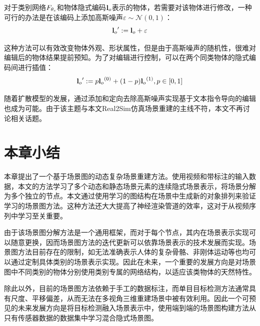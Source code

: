 对于类别网络$F_{{\theta_{c}}}$和物体隐式编码${\mathbf{l}_o}$表示的物体，若需要对该物体进行修改，一种可行的办法是在该编码上添加高斯噪声$\varepsilon\sim\mathcal{N}(0, 1)$：
\begin{equation}
    {\mathbf{l}_o}' := {\mathbf{l}_o} + \varepsilon
\end{equation}

这种方法可以有效改变物体外观、形状属性，但是由于高斯噪声的随机性，很难对编辑后的物体结果提前预知。为了对编辑进行控制，可以在两个同类物体的隐式编码间进行插值：
\begin{equation}
    \latent' := p\latent^{(0)} + (1 - p)\latent^{(1)}, \quad p\in[0,1]
\end{equation}

随着扩散模型\cite{ho_denoising_2020, poole_dreamfusion_2022, yang_learning_2023}的发展，通过添加和定向去除高斯噪声实现基于文本指令导向的编辑也成为可能。由于该主题与本文Real2Sim仿真场景重建的主线不符，本文不再讨论相关话题。

\section{本章小结}  
本章提出了一个基于场景图的动态复杂场景重建方法。使用视频和带标注的输入数据，本文的方法学习了多个动态和静态场景元素的连续隐式场景表示，将场景分解为多个独立的节点。本文通过使用学习的图结构在场景中生成新的对象排列来验证学习的场景图方法。这种方法还大大提高了神经渲染管道的效率，这对于从视频序列中学习至关重要。

由于该场景图分解方法是一个通用框架，而对于每个节点，其内在场景表示实现可以随意更换，因而场景图方法的迭代更新可以依靠场景表示的技术发展而实现。场景图方法目前存在的限制，如无法准确表示人体的复杂骨骼、非刚体运动等也均可以通过定制具体类别的场景表示实现。因此在未来，一个重要的发展方向是对场景图中不同类别的物体分别使用类别专属的网络结构，以适应该类物体的天然特性。

除此以外，目前的场景图方法依赖于手工的数据标注，而单目目标检测方法通常具有尺度、平移偏差，从而无法在多视角三维重建场景中被有效利用。因此一个可预见的未来发展方向是将目标检测融入场景表示中，使用端到端的场景图构建方法从只有传感器数据的数据集中学习混合隐式场景图。